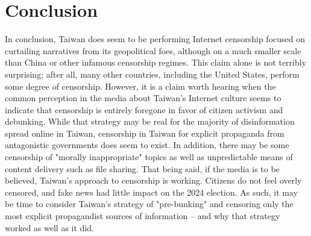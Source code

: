 \section{Conclusion}\label{sec:conclusion}

In conclusion, Taiwan does seem to be performing Internet censorship focused on curtailing narratives from its geopolitical foes, although on a much smaller 
scale than China or other infamous censorship regimes. This claim alone is not terribly surprising; after all, many other countries, including the United 
States, perform some degree of censorship. However, it is a claim worth hearing when the common perception in the media about Taiwan's Internet culture seems
to indicate that censorship is entirely foregone in favor of citizen activism and debunking. While that strategy may be real for the majority of disinformation
spread online in Taiwan, censorship in Taiwan for explicit propaganda from antagonistic governments does seem to exist. In addition, there may be some censorship
of "morally inappropriate" topics as well as unpredictable means of content delivery such as file sharing. That being said, if the media is to be believed,
Taiwan's approach to censorship is working. Citizens do not feel overly censored, and fake news had little impact on the 2024 election. As such, it may be time
to consider Taiwan's strategy of "pre-bunking" and censoring only the most explicit propagandist sources of information -- and why that strategy worked as well
as it did.